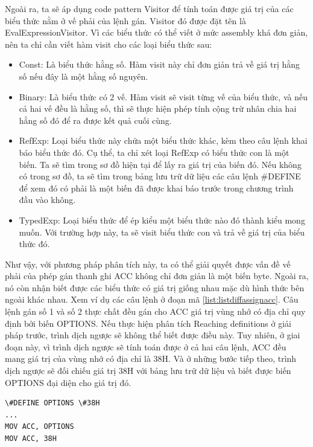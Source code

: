 Ngoài ra, ta sẽ áp dụng code pattern Visitor để tính toán được giá trị của các biểu thức nằm ở vế phải của lệnh gán. Visitor đó được đặt tên là EvalExpressionVisitor. Vì các biểu thức có thể viết ở mức assembly khá đơn giản, nên ta chỉ cần viết hàm visit cho các loại biểu thức sau:

\begin{itemize}
	\item Const: Là biểu thức hằng số. Hàm visit này chỉ đơn giản trả về giá trị hằng số nếu đây là một hằng số nguyên.
	\item Binary: Là biểu thức có 2 vế. Hàm visit sẽ visit từng vế của biểu thức, và nếu cả hai vế đều là hằng số, thì sẽ thực hiện phép tính cộng trừ nhân chia hai hằng số đó để ra được kết quả cuối cùng.
	\item RefExp: Loại biểu thức này chứa một biểu thức khác, kèm theo câu lệnh khai báo biểu thức đó. Cụ thể, ta chỉ xét loại RefExp có biểu thức con là một biến. Ta sẽ tìm trong sơ đồ hiện tại để lấy ra giá trị của biến đó. Nếu không có trong sơ đồ, ta sẽ tìm trong bảng lưu trữ dữ liệu các câu lệnh \#DEFINE để xem đó có phải là một biến đã được khai báo trước trong chương trình đầu vào không.
	\item TypedExp: Loại biểu thức để ép kiểu một biểu thức nào đó thành kiểu mong muốn. Với trường hợp này, ta sẽ visit biểu thức con và trả về giá trị của biểu thức đó.
\end{itemize}


Như vậy, với phương pháp phân tích này, ta có thể giải quyết được vấn đề vế phải của phép gán thanh ghi ACC không chỉ đơn giản là một biến byte. Ngoài ra, nó còn nhận biết được các biểu thức có giá trị giống nhau mặc dù hình thức bên ngoài khác nhau. Xem ví dụ các câu lệnh ở đoạn mã \ref{list:listdiffassignacc}. Câu lệnh gán số 1 và số 2 thực chất đều gán cho ACC giá trị vùng nhớ có địa chỉ quy định bởi biến OPTIONS. Nếu thực hiện phân tích Reaching definitions ở giải pháp trước, trình dịch ngược sẽ không thể biết được điều này. Tuy nhiên, ở giai đoạn này, vì trình dịch ngược sẽ tính toán được ở cả hai câu lệnh, ACC đều mang giá trị của vùng nhớ có địa chỉ là 38H. Và ở những bước tiếp theo, trình dịch ngược sẽ đối chiếu giá trị 38H với bảng lưu trữ dữ liệu và biết được biến OPTIONS đại diện cho giá trị đó.

\begin{lstlisting}[caption={Một số câu lệnh gán cho ACC có giá trị vế phải bằng nhau},label={list:listdiffassignacc}]
\#DEFINE OPTIONS \#38H
...
MOV ACC, OPTIONS
MOV ACC, 38H
\end{lstlisting}

